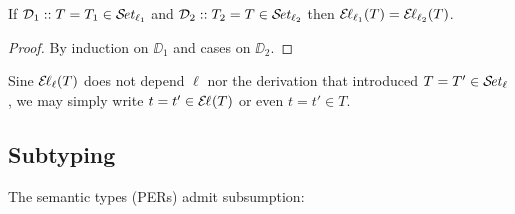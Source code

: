 \documentclass[acmlarge,review,anonymous]{acmart}\settopmatter{printfolios=true}
\begin{document}
\begin{lemma}
\label{lem:indep}
  If\/ $\DD_1 :: T = T_1 \in \SET[\ell_1]$
  and $\DD_2 :: T_2 = T \in \SET[\ell_2]$ then $\EL[\ell_1](T) = \EL[\ell_2](T)$.
\end{lemma}
\begin{proof}
  By induction on $\DD_1$ and cases on $\DD_2$.
\end{proof}
Sine $\EL[\ell](T)$ does not depend $\ell$ nor the derivation that introduced $T = T' \in \SET[\ell]$,  we may simply write $t = t' \in \EL(T)$ or even $t = t' \in T$.


\subsection{Subtyping}
\label{sec:subty}

The semantic types (PERs) admit subsumption:
\end{document}
